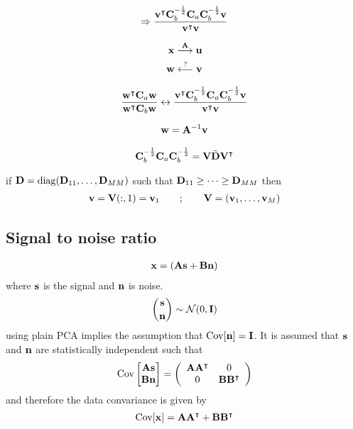 \begin{align}
	\Rightarrow \frac{\mathbf{v}^\intercal \mathbf{C}_b^{-\frac{1}{2}} \mathbf{C}_a \mathbf{C}_b^{-\frac{1}{2}} \mathbf{v}}{\mathbf{v}^\intercal \mathbf{v}}
\end{align}

\begin{align*}
	\mathbf{x} \stackrel{\mathbf{A}}{\longrightarrow} \mathbf{u} \\
	\mathbf{w} \stackrel{\text{?}}{\longleftarrow} \mathbf{v}
\end{align*}

\begin{align}
	\frac{\mathbf{w}^\intercal \mathbf{C}_a \mathbf{w}}{\mathbf{w}^\intercal \mathbf{C}_b \mathbf{w}} \leftrightarrow 
	\frac{\mathbf{v}^\intercal \mathbf{C}_b^{-\frac{1}{2}} \mathbf{C}_a \mathbf{C}_b^{-\frac{1}{2}} \mathbf{v}}{\mathbf{v}^\intercal \mathbf{v}}
\end{align}

\begin{align}
	\mathbf{w} = \mathbf{A}^{-1} \mathbf{v}
\end{align}

\begin{align}
	\mathbf{C}_b^{-\frac{1}{2}} \mathbf{C}_a \mathbf{C}_b^{-\frac{1}{2}} = \mathbf{V} \tilde{\mathbf{D}} \mathbf{V}^\intercal
\end{align}

if $\mathbf{D} = \mathrm{diag}(\mathbf{D}_{11}, \dots, \mathbf{D}_{MM})$ such that 
$\mathbf{D}_{11} \geq \dots \geq \mathbf{D}_{MM}$
then 
\begin{align}
	\mathbf{v} = \mathbf{V}(:,1) = \mathbf{v}_1 \qquad ; \qquad \mathbf{V} = (\mathbf{v}_1, \dots, \mathbf{v}_M)
\end{align}

\subsection{Signal to noise ratio}
\begin{align}
	\mathbf{x} = \left( \mathbf{A}\mathbf{s} + \mathbf{B}\mathbf{n} \right)
\end{align}
where $\mathbf{s}$ is the signal and $\mathbf{n}$ is noise.
\begin{align}
	{\mathbf{s} \choose \mathbf{n}} \sim \mathcal{N}(0,\operatorname{\mathbf{I}})
\end{align}
using plain PCA implies the assumption that $\mathrm{Cov}[\mathbf{n}] = \operatorname{\mathbf{I}}$.
It is assumed that $\mathbf{s}$ and $\mathbf{n}$ are statistically independent such that
\begin{align}
	\mathrm{Cov} \left[ \begin{matrix}
		\mathbf{As} \\ \mathbf{Bn}
	\end{matrix} \right]
	= \left( \begin{array}{c c}
		\mathbf{A A^\intercal} & 0 \\
		0 & \mathbf{B B^\intercal}
	  \end{array} \right)
\end{align}
and therefore the data convariance is given by
\begin{align*}
	\mathrm{Cov}[\mathbf{x}] = \mathbf{A A^\intercal} + \mathbf{B B^\intercal}
\end{align*}

